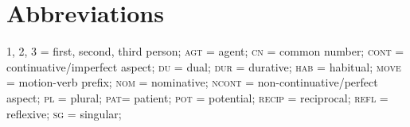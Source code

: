\documentclass[output=paper]{LSP/langsci}
\begin{document}
\section*{Abbreviations}
1, 2, 3 = first, second, third person; \textsc{agt} = agent; \textsc{cn} = common number; \textsc{cont} = continuative/imperfect aspect; \textsc{du} = dual; \textsc{dur} = durative; \textsc{hab} = habitual; \textsc{move} = motion-verb prefix; \textsc{nom} = nominative; \textsc{ncont} = non-continuative/perfect aspect; \textsc{pl} = plural; \textsc{pat}= patient; \textsc{pot} = potential; \textsc{recip} = reciprocal; \textsc{refl} = reflexive; \textsc{sg} = singular; 

{\sloppy
\printbibliography[heading=subbibliography,notkeyword=this]
}
\end{document}
